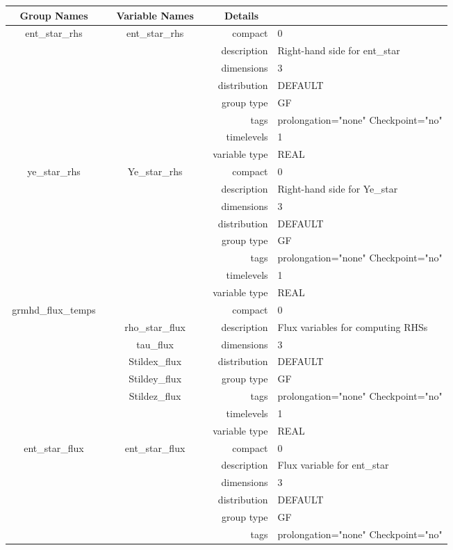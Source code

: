 \documentclass{article}
\begin{document}
\begin{tabular*}{150mm}{|c|c@{\extracolsep{\fill}}|rl|} \hline 
~ {\bf Group Names} ~ & ~ {\bf Variable Names} ~  &{\bf Details} ~ & ~ \\ 
\hline 
ent\_star\_rhs & ent\_star\_rhs & compact & 0 \\ 
 &  & description & Right-hand side for ent\_star \\ 
 &  & dimensions & 3 \\ 
 &  & distribution & DEFAULT \\ 
 &  & group type & GF \\ 
 &  & tags & prolongation="none" Checkpoint="no" \\ 
 &  & timelevels & 1 \\ 
 &  & variable type & REAL \\ 
\hline 
ye\_star\_rhs & Ye\_star\_rhs & compact & 0 \\ 
 &  & description & Right-hand side for Ye\_star \\ 
 &  & dimensions & 3 \\ 
 &  & distribution & DEFAULT \\ 
 &  & group type & GF \\ 
 &  & tags & prolongation="none" Checkpoint="no" \\ 
 &  & timelevels & 1 \\ 
 &  & variable type & REAL \\ 
\hline 
grmhd\_flux\_temps &  & compact & 0 \\ 
 & rho\_star\_flux & description & Flux variables for computing RHSs \\ 
 & tau\_flux & dimensions & 3 \\ 
 & Stildex\_flux & distribution & DEFAULT \\ 
 & Stildey\_flux & group type & GF \\ 
 & Stildez\_flux & tags & prolongation="none" Checkpoint="no" \\ 
 &  & timelevels & 1 \\ 
 &  & variable type & REAL \\ 
\hline 
ent\_star\_flux & ent\_star\_flux & compact & 0 \\ 
 &  & description & Flux variable for ent\_star \\ 
 &  & dimensions & 3 \\ 
 &  & distribution & DEFAULT \\ 
 &  & group type & GF \\ 
 &  & tags & prolongation="none" Checkpoint="no" \\ 

\end{tabular*}
\end{document}

